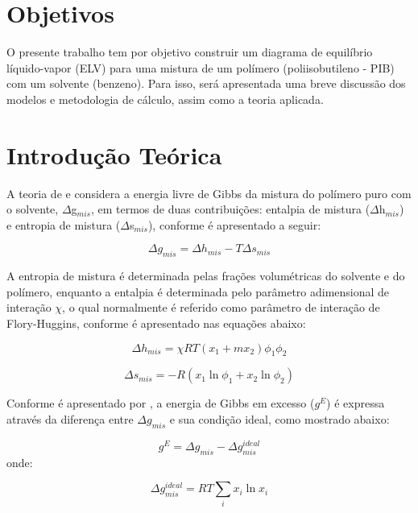 \section{Objetivos}
O presente trabalho tem por objetivo construir um diagrama de equilíbrio
líquido-vapor (ELV) para uma mistura de um polímero (poliisobutileno - PIB) com
um solvente (benzeno). Para isso, será apresentada uma breve discussão dos
modelos e metodologia de cálculo, assim como a teoria aplicada.

\section{Introdução Teórica}


A teoria de  e  considera a
energia livre de Gibbs da mistura do polímero puro com o solvente,
$\Delta$g$_{mis}$, em termos de duas contribuições: entalpia de mistura
($\Delta$h$_{mis}$) e entropia de mistura ($\Delta$s$_{mis}$), conforme é
apresentado a seguir:

\begin{equation}\label{eq:gemist}
\Delta g_{mis} = \Delta h_{mis} - T\Delta s_{mis}
\end{equation}

A entropia de mistura é determinada pelas frações volumétricas do solvente e do
polímero, enquanto a entalpia é determinada pelo parâmetro adimensional de interação
$\chi$, o qual normalmente é referido como parâmetro de interação de
Flory-Huggins, conforme é apresentado nas equações abaixo: 

\begin{equation}\label{eq:entalexc}
\Delta h_{mis} = \chi RT\left( x_1 + mx_2 \right)\phi_1\phi_2
\end{equation}

\begin{equation}\label{eq:entroexc}
\Delta s_{mis} = -R\left( x_1\ln\phi_1 + x_2\ln\phi_2 \right)
\end{equation}

Conforme é apresentado por , a energia de Gibbs em
excesso ($g^E$) é expressa através da diferença entre $\Delta g_{mis}$ e sua
condição ideal, como mostrado abaixo:

\begin{equation}\label{eq:geexc1}
g^E = \Delta g_{mis} - \Delta g_{mis}^{ideal}
\end{equation}
onde:

\begin{equation}
\Delta g_{mis}^{ideal} = RT\sum_ix_i\ln x_i
\end{equation}

